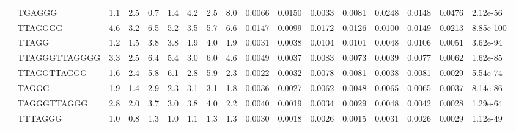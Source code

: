 \begin{landscape}
\begin{samepage}
\begin{table}[h!]
\begin{tabular}{lllllllllllllllll}
\textbf{}    & TGAGGG         & 1.1            & 2.5            & 0.7            & 1.4            & 4.2            & 2.5            & 8.0            & 0.0066         & 0.0150         & 0.0033         & 0.0081         & 0.0248         & 0.0148         & 0.0476         & 2.12e-56                   \\
\textbf{}    & TTAGGGG        & 4.6            & 3.2            & 6.5            & 5.2            & 3.5            & 5.7            & 6.6            & 0.0147         & 0.0099         & 0.0172         & 0.0126         & 0.0100         & 0.0149         & 0.0213         & 8.85e-100                  \\
\textbf{}    & TTAGG          & 1.2            & 1.5            & 3.8            & 3.8            & 1.9            & 4.0            & 1.9            & 0.0031         & 0.0038         & 0.0104         & 0.0101         & 0.0048         & 0.0106         & 0.0051         & 3.62e-94                   \\
\textbf{}    & TTAGGGTTAGGGG  & 3.3            & 2.5            & 6.4            & 5.4            & 3.0            & 6.0            & 4.6            & 0.0049         & 0.0037         & 0.0083         & 0.0073         & 0.0039         & 0.0077         & 0.0062         & 1.62e-85                   \\
\textbf{}    & TTAGGTTAGGG    & 1.6            & 2.4            & 5.8            & 6.1            & 2.8            & 5.9            & 2.3            & 0.0022         & 0.0032         & 0.0078         & 0.0081         & 0.0038         & 0.0081         & 0.0029         & 5.54e-74                   \\
\textbf{}    & TAGGG          & 1.9            & 1.4            & 2.9            & 2.3            & 3.1            & 3.1            & 1.8            & 0.0036         & 0.0027         & 0.0062         & 0.0048         & 0.0065         & 0.0065         & 0.0037         & 8.14e-86                   \\
\textbf{}    & TAGGGTTAGGG    & 2.8            & 2.0            & 3.7            & 3.0            & 3.8            & 4.0            & 2.2            & 0.0040         & 0.0019         & 0.0034         & 0.0029         & 0.0048         & 0.0042         & 0.0028         & 1.29e-64                   \\
\textbf{}    & TTTAGGG        & 1.0            & 0.8            & 1.3            & 1.0            & 1.1            & 1.3            & 1.3            & 0.0030         & 0.0018         & 0.0026         & 0.0015         & 0.0031         & 0.0026         & 0.0029         & 1.12e-49                   \\

\end{tabular}
\end{table}
\end{samepage}
\end{landscape}
